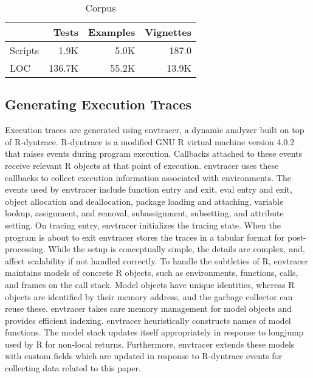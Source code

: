 \documentclass[10pt,review,sigplan,authorversion=true]{acmart}
\newcommand{\envtracer}{{\sf envtracer}\xspace}
\newcommand{\rdyntrace}{{\sf R-dyntrace}\xspace}
\begin{document}
\begin{table}[!h]
  \vspace{-3mm}
  \small
  \centering
  \caption{Corpus}\label{table:corpus}
  \vspace{-3mm}
  \begin{tabular}{lrrr}
    \toprule
    &\bf Tests&\bf Examples&\bf Vignettes\\
    \midrule
    {Scripts}&1.9K&5.0K&187.0\\
    \midrule
    {LOC}&136.7K&55.2K&13.9K\\
    \bottomrule
  \end{tabular}
\end{table}

\subsection{Generating Execution Traces}

Execution traces are generated using \envtracer, a dynamic analyzer built on top
of \rdyntrace. \rdyntrace is a modified GNU R virtual machine version
4.0.2~\cite{oopsla19b} that raises events during program execution. Callbacks
attached to these events receive relevant R objects at that point of execution.
\envtracer uses these callbacks to collect execution information associated with
environments. The events used by \envtracer include function entry and exit,
eval entry and exit, object allocation and deallocation, package loading and
attaching, variable lookup, assignment, and removal, subassignment, subsetting,
and attribute setting. On tracing entry, \envtracer initializes the tracing
state. When the program is about to exit \envtracer stores the traces in a
tabular format for post-processing. While the setup is conceptually simple, the
details are complex, and, affect scalability if not handled correctly. To handle
the subtleties of R, \envtracer maintains models of concrete R objects, such as
environments, functions, calls, and frames on the call stack. Model objects have
unique identities, whereas R objects are identified by their memory address, and
the garbage collector can reuse these. \envtracer takes care memory management
for model objects and provides efficient indexing. \envtracer heuristically
constructs names of model functions. The model stack updates itself
appropriately in response to longjump used by R for non-local returns.
Furthermore, \envtracer extends these models with custom fields which are
updated in response to \rdyntrace events for collecting data related to this
paper.
\end{document}
